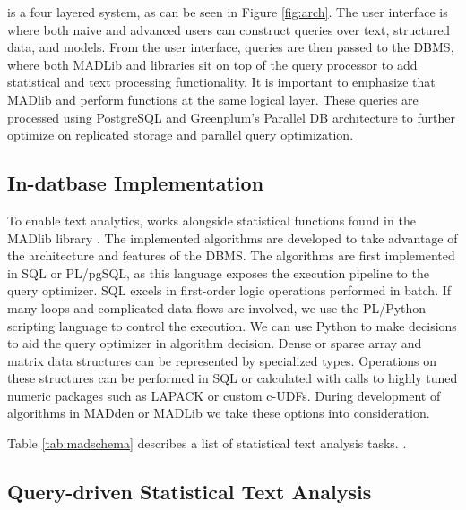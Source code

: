 {\system} is a four layered system, as can be seen in Figure \ref{fig:arch}.
The user interface is where both naive and advanced users can construct queries over
text, structured data, and models. From the user interface, queries are then passed to the
DBMS, where both MADLib and {\system} libraries sit on top of the query processor to
add statistical and text processing functionality. 
It is important to emphasize that MADlib and {\system} perform functions
at the same logical layer.  These queries are processed using 
PostgreSQL and Greenplum's Parallel DB architecture to further optimize on 
replicated storage and parallel query optimization. 









\subsection{In-datbase Implementation}
To enable text analytics, {\system} works alongside statistical
functions found in the MADlib library \cite{Cohen:2009:MSN:1687553.1687576}.
The implemented algorithms are developed to take advantage of the 
architecture and features of the DBMS.
The algorithms are first implemented in SQL or PL/pgSQL, as this language
exposes the execution pipeline to the query optimizer. 
SQL excels in first-order logic operations performed in batch.
If many loops and complicated data flows are involved, we use the PL/Python 
scripting language to control the execution.
We can use Python to make decisions to aid the query optimizer in algorithm
decision.
Dense or sparse array and matrix data structures can be represented
by specialized types. Operations on these structures can be performed in
SQL or calculated with calls to highly tuned numeric packages such as LAPACK
or custom c-UDFs.
During development of algorithms in MADden or MADLib we take these options 
into consideration.

Table \ref{tab:madschema} describes a list of statistical text 
analysis tasks.
{\system}.


\subsection{Query-driven Statistical Text Analysis}

